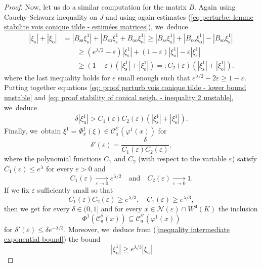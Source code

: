 \documentclass[JEP,XML,SOM,Unicode,NoEqCountersInSection,NoFloatCountersInSection,published]{cedram}
\newcommand{\ro}{\mathrm{o}}
\newcommand{\rs}{\mathrm{s}}
\newcommand{\rso}{\mathrm{so}}
\newcommand{\ru}{\mathrm{u}}
\theoremstyle{definition}
\theoremstyle{plain}
\newcommand{\Ccal}{\mathcal{C}}
\newcommand{\Ncal}{\mathcal{N}}
\begin{document}
\begin{proof}
Now, let us do a similar computation for the matrix $B$.
Again using Cauchy-Schwarz inequality on $J$ and using again estimates (\ref{eq perturbe: lemme stabilite vois conique tilde - estimées matrices}), we~deduce
\begin{equation}\label{eq: proof stability of conical neigh. - inequality 2 unstable}
\begin{split}
|\xi_\rs| + |\xi_\ro| &= | B_{\rs\rs} \xi_\rs^1 | + |B_{\rso} \xi_\rs^1 + B_{\ro\ro} \xi_\ro^1 | \geq |B_{\rs\rs} \xi_\rs^1| + |B_{\ro\ro} \xi_\ro^1| - |B_{\rso} \xi_\rs^1| \\
&\qquad \geq (e^{\lambda/2} -\varepsilon) |\xi_\rs^1| + (1 - \varepsilon)|\xi_\ro^1| - \varepsilon |\xi_\rs^1| \\
&\qquad \geq (1 - \varepsilon)(|\xi_\rs^1| + |\xi_\ro^1|) =: C_2 (\varepsilon) (|\xi_\rs^1| + |\xi_\ro^1|).
\end{split}
\end{equation}
where the last inequality holds for $\varepsilon$ small enough such that $e^{\lambda/2} - 2 \varepsilon \geq 1 - \varepsilon$.
Putting together equations \eqref{eq: proof perturb vois conique tilde - lower bound unstable} and \eqref{eq: proof stability of conical neigh. - inequality 2 unstable}, we~deduce
\begin{align*}
\delta|\xi_\ru^1| > C_1 (\varepsilon) C_2 (\varepsilon) (|\xi_\rs^1| + |\xi_\ro^1|).
\end{align*}
Finally, we~obtain $\xi^1 = \Phi_x^1 (\xi) \in \Ccal_\ru^{\delta'}(\varphi^1 (x))$ for
\[
\delta'(\varepsilon) = \frac{\delta }{C_1 (\varepsilon) C_2 (\varepsilon)},
\]
where the polynomial functions $C_1$ and $C_2$ (with respect to the variable $\varepsilon$) satisfy $C_1 (\varepsilon) \leq e^{\lambda}$ for every $\varepsilon >0$ and
\[
C_1 (\varepsilon) \underset{\varepsilon \to 0}{\to} e^{\lambda/2} \quad\text{and}\quad C_2 (\varepsilon) \underset{\varepsilon\to 0}{\to} 1.
\]
If we fix $\varepsilon$ sufficiently small so that
\begin{equation}\label{eq: proof big lemma - estimates C1 C2}
C_1 (\varepsilon) C_2 (\varepsilon) \geq e^{\lambda/3}, \quad C_1 (\varepsilon) \geq e^{\lambda/3},
\end{equation}
then we get for every $\delta\in(0,1]$ and for every $x \in \Ncal (\varepsilon)\cap W^\ru(K)$ the inclusion
\[
\Phi^{1}\left(\Ccal_{\ru}^{\delta}(x)\right) \subseteq \Ccal_{\ru}^{\delta'}(\varphi^{1}(x))
\]
for $\delta'(\varepsilon) \leq \delta e^{-\lambda/3}$. Moreover, we~deduce from (\ref{inequality intermediate exponential bound}) the bound
\begin{equation}\label{inequality intermediate exponential bound 2}
|\xi_\ru^{1}| \geq e^{\lambda/3} |\xi_\ru|
\end{equation}


\end{proof}
\end{document}
